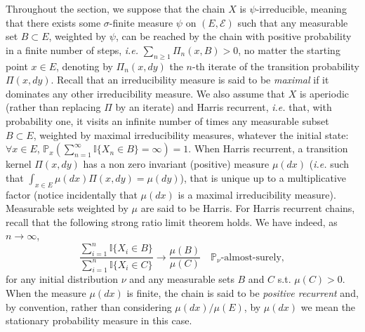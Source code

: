 \documentclass[sn-mathphys-ay]{sn-jnl}%
\begin{document}
Throughout the section, we suppose that the chain $X$ is $\psi$-irreducible, meaning that
there exists some $\sigma$-finite measure $\psi$ on $(E,\mathcal{E})$ such that any
measurable set $B\subset E$, weighted by $\psi$, can be reached by the chain with
positive probability in a finite number of steps, \textit{i.e.} $\sum_{n\geq
        1}\Pi_{n}(x,B)>0$, no matter the starting point $x\in E$, denoting by $\Pi_n(x,dy)$ the
$n$-th iterate of the transition probability $\Pi(x,dy)$. Recall that an irreducibility
measure is said to be \textit{maximal} if it dominates any other irreducibility measure.
We also assume that $X$ is aperiodic (rather than replacing $\Pi$ by an iterate) and
Harris recurrent, \textit{i.e.} that, with probability one, it visits an infinite number
of times any measurable subset $B\subset E$, weighted by maximal irreducibility measures,
whatever the initial state: $\forall x\in E$,
$\mathbb{P}_x\left(\sum_{n=1}^{\infty}\mathbb{I}\{ X_n\in B \}=\infty\right)=1$. When
Harris recurrent, a transition kernel $\Pi(x,dy)$ has a non zero invariant (positive)
measure $\mu(dx)$ (\textit{i.e.} such that $\int_{x\in E}\mu(dx)\Pi(x,dy)=\mu(dy)$), that
is unique up to a multiplicative factor (notice incidentally that $\mu(dx)$ is a maximal
irreducibility measure). Measurable sets weighted by $\mu$ are said to be Harris. For
Harris recurrent chains, recall that the following strong ratio limit theorem holds. We
have indeed, as $n\rightarrow \infty$,
\begin{equation}\label{eq:SLLN}
    \frac{\sum_{i=1}^n\mathbb{I}\{ X_i\in B \}}{\sum_{i=1}^n\mathbb{I}\{ X_i\in C \}}
    \rightarrow \frac{\mu(B)}{\mu(C)}\quad \mathbb{P}_{\nu}\text{-almost-surely},
\end{equation}
for any initial distribution $\nu$ and any measurable sets $B$ and $C$ s.t. $\mu(C)>0$.
When the measure $\mu(dx)$ is finite, the chain is said to be \textit{positive recurrent}
and, by convention, rather than considering $\mu(dx)/\mu(E)$, by $\mu(dx)$ we mean the
stationary probability measure in this case.\medskip
\end{document}
